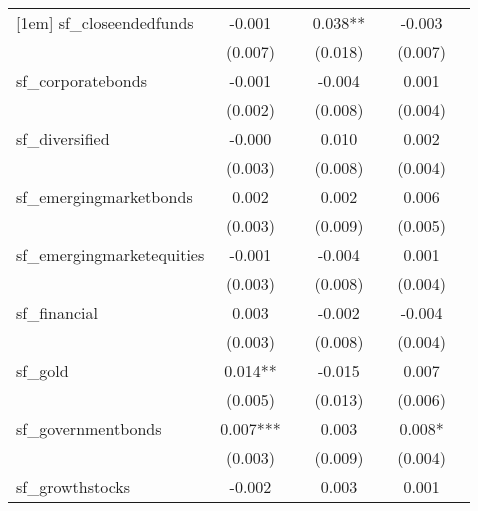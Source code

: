 {\begin{tabular}{l*{6}{c}}
[1em]
sf\_closeendedfunds&      -0.001   &               &       0.038** &               &      -0.003   &               \\
            &     (0.007)   &               &     (0.018)   &               &     (0.007)   &               \\
[1em]
sf\_corporatebonds&      -0.001   &               &      -0.004   &               &       0.001   &               \\
            &     (0.002)   &               &     (0.008)   &               &     (0.004)   &               \\
[1em]
sf\_diversified&      -0.000   &               &       0.010   &               &       0.002   &               \\
            &     (0.003)   &               &     (0.008)   &               &     (0.004)   &               \\
[1em]
sf\_emergingmarketbonds&       0.002   &               &       0.002   &               &       0.006   &               \\
            &     (0.003)   &               &     (0.009)   &               &     (0.005)   &               \\
[1em]
sf\_emergingmarketequities&      -0.001   &               &      -0.004   &               &       0.001   &               \\
            &     (0.003)   &               &     (0.008)   &               &     (0.004)   &               \\
[1em]
sf\_financial&       0.003   &               &      -0.002   &               &      -0.004   &               \\
            &     (0.003)   &               &     (0.008)   &               &     (0.004)   &               \\
[1em]
sf\_gold     &       0.014** &               &      -0.015   &               &       0.007   &               \\
            &     (0.005)   &               &     (0.013)   &               &     (0.006)   &               \\
[1em]
sf\_governmentbonds&       0.007***&               &       0.003   &               &       0.008*  &               \\
            &     (0.003)   &               &     (0.009)   &               &     (0.004)   &               \\
[1em]
sf\_growthstocks&      -0.002   &               &       0.003   &               &       0.001   &               \\

\end{tabular}}
